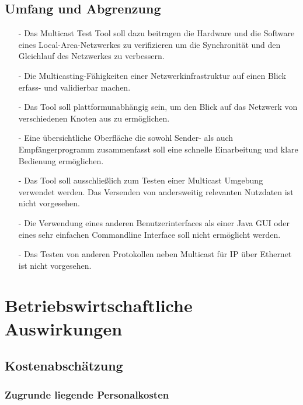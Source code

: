 \section{Umfang und Abgrenzung}

\begin{itemize}
 \item[-]
 Das Multicast Test Tool soll dazu beitragen die Hardware und die Software
 eines Local-Area-Netzwerkes zu verifizieren um die Synchronität und den
 Gleichlauf des Netzwerkes zu verbessern.
  \item[-]
  Die Multicasting-Fähigkeiten einer Netzwerkinfrastruktur auf einen Blick erfass-
  und validierbar machen.
   \item[-]
   Das Tool soll plattformunabhängig sein, um den Blick auf das Netzwerk von
   verschiedenen Knoten aus zu ermöglichen.
    \item[-]
    Eine übersichtliche Oberfläche die sowohl Sender- als auch Empfängerprogramm
    zusammenfasst soll eine schnelle Einarbeitung und klare Bedienung ermöglichen.
     \item[-]
     Das Tool soll ausschließlich zum Testen einer Multicast Umgebung verwendet
     werden. Das Versenden von andersweitig relevanten Nutzdaten ist nicht vorgesehen.
      \item[-]
      Die Verwendung eines anderen Benutzerinterfaces als einer Java GUI oder eines 
      sehr einfachen Commandline Interface soll nicht ermöglicht werden.
       \item[-]
       Das Testen von anderen Protokollen neben Multicast für IP über Ethernet ist nicht vorgesehen.
       \end{itemize}

\chapter{Betriebswirtschaftliche Auswirkungen}
\section{Kostenabschätzung}

\subsection{Zugrunde liegende Personalkosten}

